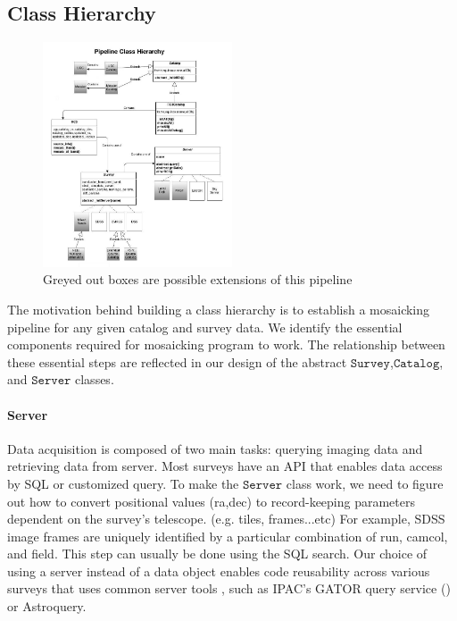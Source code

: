 \documentclass[5p]{elsarticle}
\begin{document}
	\subsection{Class Hierarchy}
	\begin{figure}[h]
		\includegraphics[width=0.5\textwidth]{figures/pipeline.jpg}
		\caption{Greyed out boxes are possible extensions of this pipeline}
	\end{figure}
 	The motivation behind building a class hierarchy is to establish a mosaicking pipeline for any given catalog and survey data. We identify the essential components required for mosaicking program to work. The relationship between these essential steps are reflected in our design of the abstract $\texttt{Survey}$,$\texttt{Catalog}$, and $\texttt{Server}$ classes. 
 		\paragraph{Server}
		Data acquisition is composed of two main tasks: querying imaging data and retrieving data from server. Most surveys have an API that enables data access by SQL or customized query. To make the $\texttt{Server}$ class work, we need to figure out how to convert positional values (ra,dec) to record-keeping parameters dependent on the survey's telescope. (e.g. tiles, frames...etc) For example, SDSS image frames are uniquely identified by a particular combination of  run, camcol, and field.  This step can usually be done using the SQL search. Our choice of using a server instead of a data object enables code reusability across various surveys that uses common server tools , such as IPAC's GATOR query service (\citet{irsa}) or  Astroquery.
\end{document}
